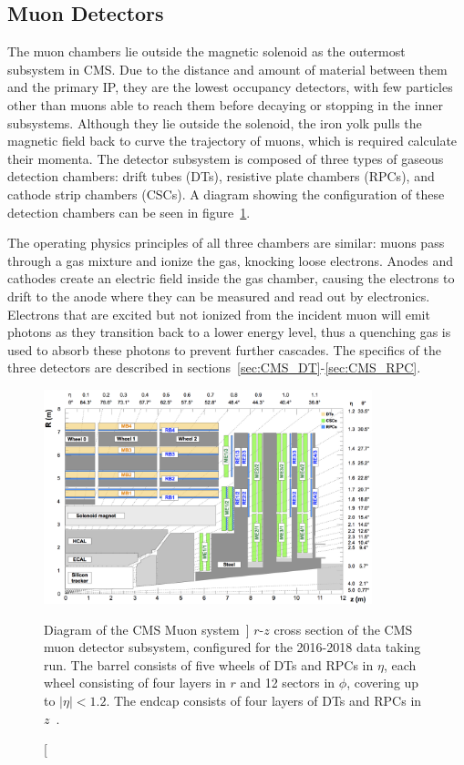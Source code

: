 \subsection{Muon Detectors} \label{sec:CMS_Muons}
The muon chambers lie outside the magnetic solenoid as the outermost subsystem in CMS. Due to the distance and amount of material between them and the primary IP, they are the lowest occupancy detectors, with few particles other than muons able to reach them before decaying or stopping in the inner subsystems. Although they lie outside the solenoid, the iron yolk pulls the magnetic field back to curve the trajectory of muons, which is required calculate their momenta. The detector subsystem is composed of three types of gaseous detection chambers: drift tubes (DTs), resistive plate chambers (RPCs), and cathode strip chambers (CSCs). A diagram showing the configuration of these detection chambers can be seen in figure~\ref{fig:Muons}.

The operating physics principles of all three chambers are similar: muons pass through a gas mixture and ionize the gas, knocking loose electrons. Anodes and cathodes create an electric field inside the gas chamber, causing the electrons to drift to the anode where they can be measured and read out by electronics. Electrons that are excited but not ionized from the incident muon will emit photons as they transition back to a lower energy level, thus a quenching gas is used to absorb these photons to prevent further cascades. The specifics of the three detectors are described in sections~\ref{sec:CMS_DT}-\ref{sec:CMS_RPC}.

\begin{figure}[htpb]
	\centering
	\includegraphics[width=0.85\textwidth]{figs/03_experiment/Muon_system.png}
	\caption
	[Diagram of the CMS Muon system~\cite{Sirunyan:2313130}]
	{$r$-$z$ cross section of the CMS muon detector subsystem, configured for the 2016-2018 data taking run. The barrel consists of five wheels of DTs and RPCs in $\eta$, each wheel consisting of four layers in $r$ and 12 sectors in $\phi$, covering up to $\left|\eta\right| < 1.2$. The endcap consists of four layers of DTs and RPCs in $z$~\cite{Sirunyan:2313130}.}
	\label{fig:Muons}
\end{figure}

